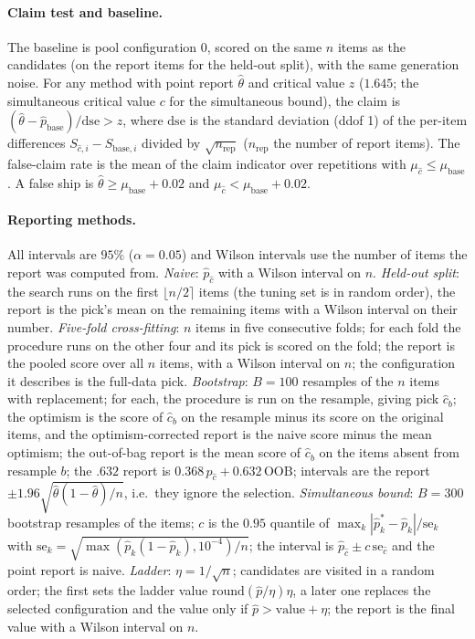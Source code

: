 \paragraph{Claim test and baseline.} The baseline is pool configuration $0$, scored on the same $n$ items as the candidates (on the report items for the held-out split), with the same generation noise. For any method with point report $\hat\theta$ and critical value $z$ ($1.645$; the simultaneous critical value $c$ for the simultaneous bound), the claim is $(\hat\theta-\hat p_{\text{base}})/\mathrm{dse}>z$, where $\mathrm{dse}$ is the standard deviation (ddof 1) of the per-item differences $S_{\hat c,i}-S_{\text{base},i}$ divided by $\sqrt{n_{\text{rep}}}$ ($n_{\text{rep}}$ the number of report items). The false-claim rate is the mean of the claim indicator over repetitions with $\mu_{\hat c}\le\mu_{\text{base}}$. A false ship is $\hat\theta\ge\mu_{\text{base}}+0.02$ and $\mu_{\hat c}<\mu_{\text{base}}+0.02$.

\paragraph{Reporting methods.} All intervals are $95\%$ ($\alpha=0.05$) and Wilson intervals use the number of items the report was computed from.
\emph{Naive}: $\hat p_{\hat c}$ with a Wilson interval on $n$. \emph{Held-out split}: the search runs on the first $\lfloor n/2\rceil$ items (the tuning set is in random order), the report is the pick's mean on the remaining items with a Wilson interval on their number. \emph{Five-fold cross-fitting}: $n$ items in five consecutive folds; for each fold the procedure runs on the other four and its pick is scored on the fold; the report is the pooled score over all $n$ items, with a Wilson interval on $n$; the configuration it describes is the full-data pick. \emph{Bootstrap}: $B=100$ resamples of the $n$ items with replacement; for each, the procedure is run on the resample, giving pick $\hat c_b$; the optimism is the score of $\hat c_b$ on the resample minus its score on the original items, and the optimism-corrected report is the naive score minus the mean optimism; the out-of-bag report is the mean score of $\hat c_b$ on the items absent from resample $b$; the $.632$ report is $0.368\,\hat p_{\hat c}+0.632\,\text{OOB}$; intervals are the report $\pm1.96\sqrt{\hat\theta(1-\hat\theta)/n}$, i.e.\ they ignore the selection. \emph{Simultaneous bound}: $B=300$ bootstrap resamples of the items; $c$ is the $0.95$ quantile of $\max_k|\hat p^*_k-\hat p_k|/\mathrm{se}_k$ with $\mathrm{se}_k=\sqrt{\max(\hat p_k(1-\hat p_k),10^{-4})/n}$; the interval is $\hat p_{\hat c}\pm c\,\mathrm{se}_{\hat c}$ and the point report is naive. \emph{Ladder}: $\eta=1/\sqrt n$; candidates are visited in a random order; the first sets the ladder value $\mathrm{round}(\hat p/\eta)\eta$, a later one replaces the selected configuration and the value only if $\hat p>\text{value}+\eta$; the report is the final value with a Wilson interval on $n$.

